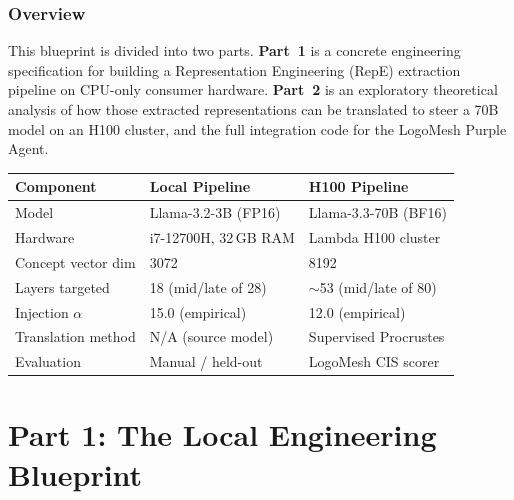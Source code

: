 \documentclass[11pt, a4paper]{article}
\begin{document}
\section*{Overview}

This blueprint is divided into two parts. \textbf{Part~1} is a concrete
engineering specification for building a Representation Engineering (RepE)
extraction pipeline on CPU-only consumer hardware. \textbf{Part~2} is an
exploratory theoretical analysis of how those extracted representations can be
translated to steer a 70B model on an H100 cluster, and the full integration
code for the LogoMesh Purple Agent.

\begin{center}
\begin{tabular}{lll}
  \toprule
  \textbf{Component} & \textbf{Local Pipeline} & \textbf{H100 Pipeline} \\
  \midrule
  Model              & Llama-3.2-3B (FP16)     & Llama-3.3-70B (BF16)  \\
  Hardware           & i7-12700H, 32\,GB RAM   & Lambda H100 cluster   \\
  Concept vector dim & 3072                    & 8192                  \\
  Layers targeted    & 18 (mid/late of 28)     & $\sim$53 (mid/late of 80) \\
  Injection $\alpha$ & 15.0 (empirical)        & 12.0 (empirical)      \\
  Translation method & N/A (source model)      & Supervised Procrustes \\
  Evaluation         & Manual / held-out       & LogoMesh CIS scorer   \\
  \bottomrule
\end{tabular}
\end{center}

\part*{Part 1: The Local Engineering Blueprint}

\end{document}
